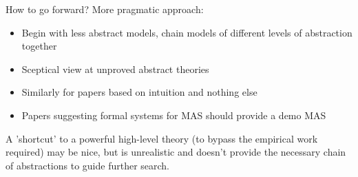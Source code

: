 \documentclass[10pt,a4paper]{beamer}
\begin{document}
\begin{frame}{How to go forward?}
More pragmatic approach:
\begin{itemize}
\item Begin with less abstract models, chain models of different levels of abstraction together
\item Sceptical view at unproved abstract theories
\item Similarly for papers based on intuition and nothing else
\item Papers suggesting formal systems for MAS should provide a demo MAS
\end{itemize}
A 'shortcut' to a powerful high-level theory (to bypass the empirical work required) may be nice, but is unrealistic and doesn't provide the necessary chain of abstractions to guide further search.
\end{frame}
	
\end{document}
